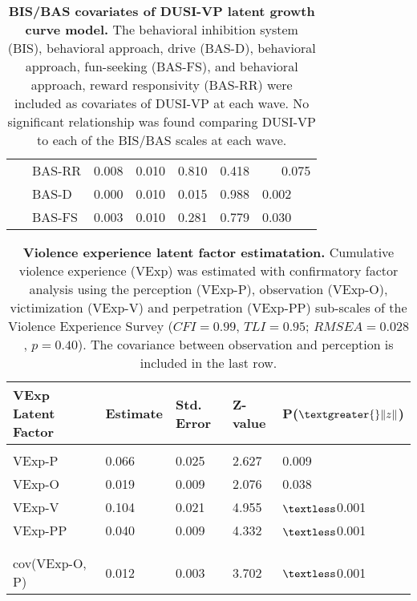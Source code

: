\documentclass[utf8]{article}
\begin{document}
\begin{table}[h!]
\begin{tabular}{llllll}
\ \ \ BAS-RR                         & 0.008    & 0.010      & 0.810   & 0.418                    & \ \ \ 0.075   \\
\ \ \ BAS-D                          & 0.000    & 0.010      & 0.015   & 0.988                    & 0.002   \\
\ \ \ BAS-FS                         & 0.003    & 0.010      & 0.281   & 0.779                    & 0.030   \\  
\end{tabular}
\caption{\textbf{BIS/BAS covariates of DUSI-VP latent growth curve model.} The behavioral inhibition system (BIS), behavioral approach, drive (BAS-D), behavioral approach, fun-seeking (BAS-FS), and behavioral approach, reward responsivity (BAS-RR) were included as covariates of DUSI-VP at each wave. No significant relationship was found comparing DUSI-VP to each of the BIS/BAS scales at each wave. \label{tab:2}}
\end{table}
\begin{table}[h!]
\begin{tabular}{lllll}
VExp Latent Factor & Estimate & Std. Error & Z-value & P($\textgreater{}\|z\|$) \\ \hline
                   &          &            &         &                          \\
VExp-P             & 0.066    & 0.025      & 2.627   & 0.009                    \\
VExp-O             & 0.019    & 0.009      & 2.076   & 0.038                    \\
VExp-V             & 0.104    & 0.021      & 4.955   & $\textless$0.001                    \\
VExp-PP            & 0.040    & 0.009      & 4.332   & $\textless$0.001 \\ \\ \hline \\
cov(VExp-O, P)             & 0.012    & 0.003      & 3.702   & $\textless$0.001                                     
\end{tabular}
\caption{\textbf{Violence experience latent factor estimatation.} Cumulative violence experience (VExp) was estimated with confirmatory factor analysis using the perception (VExp-P), observation (VExp-O), victimization (VExp-V) and perpetration (VExp-PP) sub-scales of the Violence Experience Survey ($CFI = 0.99$, $TLI = 0.95$; $RMSEA = 0.028$, $p = 0.40$). The covariance between observation and perception is included in the last row. \label{tab:3}}
\end{table} 
\end{document}
